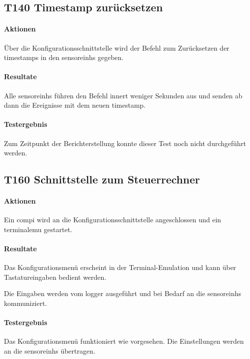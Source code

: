 \subsection{T140 Timestamp zurücksetzen}
\paragraph{Aktionen} Über die Konfigurationsschnittstelle wird der Befehl zum Zurücksetzen der \gls{timestamp}s in den \glspl{sensoreinh} gegeben.

\paragraph{Resultate} Alle \glspl{sensoreinh} führen den Befehl innert weniger Sekunden aus und senden ab dann die Ereignisse mit dem neuen \gls{timestamp}.

\paragraph{Testergebnis} Zum Zeitpunkt der Berichterstellung konnte dieser Test noch nicht durchgeführt werden. 

\subsection{T160 Schnittstelle zum Steuerrechner}
\paragraph{Aktionen} Ein \gls{compi} wird an die Konfigurationsschnittstelle angeschlossen und ein \gls{terminalemu} gestartet.

\paragraph{Resultate} Das Konfigurationsmenü erscheint in der Terminal-Emulation und kann über Tastatureingaben bedient werden.

Die Eingaben werden vom \gls{logger} ausgeführt und bei Bedarf an die \glspl{sensoreinh} kommuniziert.

\paragraph{Testergebnis} Das Konfigurationsmenü funktioniert wie vorgesehen. Die Einstellungen werden an die \glspl{sensoreinh} übertragen.

